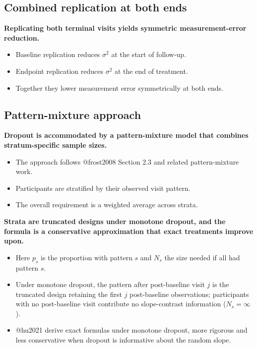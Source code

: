 \documentclass[
  11pt,
]{article}
\begin{document}
\subsection{Combined replication at both ends}\label{combined-replication-at-both-ends}

\textbf{Replicating both terminal visits yields symmetric measurement-error reduction.}

\begin{itemize}\setlength{\itemsep}{2pt}\setlength{\parskip}{0pt}
\item Baseline replication reduces $\sigma^2$ at the start of follow-up.
\item Endpoint replication reduces $\sigma^2$ at the end of treatment.
\item Together they lower measurement error symmetrically at both ends.
\end{itemize}

\subsection{Pattern-mixture approach}\label{pattern-mixture-approach}

\textbf{Dropout is accommodated by a pattern-mixture model that combines stratum-specific sample sizes.}

\begin{itemize}\setlength{\itemsep}{2pt}\setlength{\parskip}{0pt}
\item The approach follows @frost2008 Section 2.3 and related pattern-mixture work.
\item Participants are stratified by their observed visit pattern.
\item The overall requirement is a weighted average across strata.
\end{itemize}

\textbf{Strata are truncated designs under monotone dropout, and the formula is a conservative approximation that exact treatments improve upon.}

\begin{itemize}\setlength{\itemsep}{2pt}\setlength{\parskip}{0pt}
\item Here $p_s$ is the proportion with pattern $s$ and $N_s$ the size needed if all had pattern $s$.
\item Under monotone dropout, the pattern after post-baseline visit $j$ is the truncated design retaining the first $j$ post-baseline observations; participants with no post-baseline visit contribute no slope-contrast information ($N_s = \infty$).
\item @hu2021 derive exact formulas under monotone dropout, more rigorous and less conservative when dropout is informative about the random slope.
\end{itemize}
\end{document}
